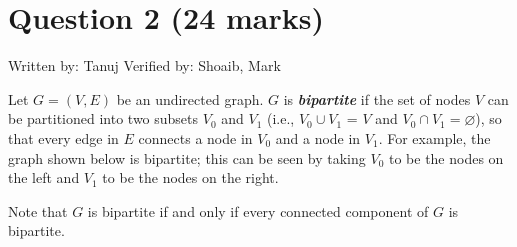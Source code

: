 \documentclass[11pt]{article}
\begin{document}
\section*{Question 2 (24 marks)}
Written by: Tanuj\newline
Verified by: Shoaib, Mark\newline

\noindent Let $G = (V, E)$ be an undirected graph. $G$ is \textbf{\textit{bipartite}} if the set of nodes $V$
can be partitioned into two subsets $V_0$ and $V_1$ (i.e., $V_0 \cup V_1$ = $V$ and $V_0 \cap V_1 = \varnothing$), so that every edge in
$E$ connects a node in $V_0$ and a node in $V_1$. For example, the graph shown below is bipartite; this can be
seen by taking $V_0$ to be the nodes on the left and $V_1$ to be the nodes on the right.\newline

\noindent Note that $G$ is bipartite if and only if every connected component of $G$ is bipartite.
\end{document}

